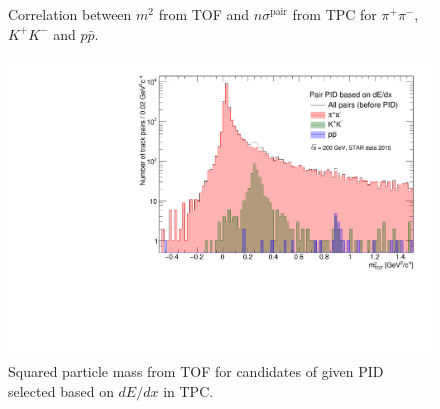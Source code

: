 \begin{figure}[ht!]
{  \begin{subfigure}[b]{\linewidth}{
                }
  \end{subfigure}
}%
\caption{Correlation between $m^{2}$ from TOF and $n\sigma^{\textrm{pair}}$ from TPC for $\pi^{+}\pi^{-}$, $K^{+}K^{-}$ and $p\bar{p}$.}
\end{figure}







\begin{figure}[ht!]
\centering%
\includegraphics[width=0.65\linewidth,page=1]{graphics/eventSelection/sqMassFromTof.pdf}%
\caption{Squared particle mass from TOF for candidates of given PID selected based on $dE/dx$ in TPC.}\label{fig:sqMassFromTof}%
\end{figure}



